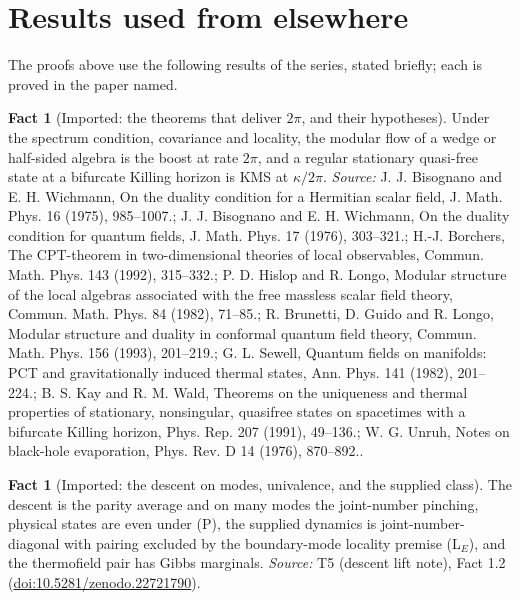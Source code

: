 \documentclass[11pt]{article}
\theoremstyle{definition}
\newtheorem{fact}[theorem]{Fact}
\theoremstyle{plain}
\begin{document}
\section{Results used from elsewhere}
The proofs above use the following results of the series, stated briefly; each is proved in the paper named.

\begin{fact}[Imported: the theorems that deliver $2\pi$, and their hypotheses]\label{c:angle.imported-theorems-deliver-their-hypotheses}
Under the spectrum condition, covariance and locality, the modular flow of a wedge or half-sided algebra is the boost at rate $2\pi$, and a regular stationary quasi-free state at a bifurcate Killing horizon is KMS at $\kappa/2\pi$.
\emph{Source:} J. J. Bisognano and E. H. Wichmann, On the duality condition for a Hermitian scalar field, J. Math. Phys. 16 (1975), 985--1007.; J. J. Bisognano and E. H. Wichmann, On the duality condition for quantum fields, J. Math. Phys. 17 (1976), 303--321.; H.-J. Borchers, The CPT-theorem in two-dimensional theories of local observables, Commun. Math. Phys. 143 (1992), 315--332.; P. D. Hislop and R. Longo, Modular structure of the local algebras associated with the free massless scalar field theory, Commun. Math. Phys. 84 (1982), 71--85.; R. Brunetti, D. Guido and R. Longo, Modular structure and duality in conformal quantum field theory, Commun. Math. Phys. 156 (1993), 201--219.; G. L. Sewell, Quantum fields on manifolds: PCT and gravitationally induced thermal states, Ann. Phys. 141 (1982), 201--224.; B. S. Kay and R. M. Wald, Theorems on the uniqueness and thermal properties of stationary, nonsingular, quasifree states on spacetimes with a bifurcate Killing horizon, Phys. Rep. 207 (1991), 49--136.; W. G. Unruh, Notes on black-hole evaporation, Phys. Rev. D 14 (1976), 870--892..
\end{fact}

\begin{fact}[Imported: the descent on modes, univalence, and the supplied class]\label{c:descent-lift.imported-descent-modes-univalence-supplied-class}
The descent is the parity average and on many modes the joint-number pinching, physical states are even under (P), the supplied dynamics is joint-number-diagonal with pairing excluded by the boundary-mode locality premise (L$_E$), and the thermofield pair has Gibbs marginals.
\emph{Source:} T5 (descent lift note), Fact 1.2 (\href{https://doi.org/10.5281/zenodo.22721790}{doi:10.5281/zenodo.22721790}).
\end{fact}
\end{document}
